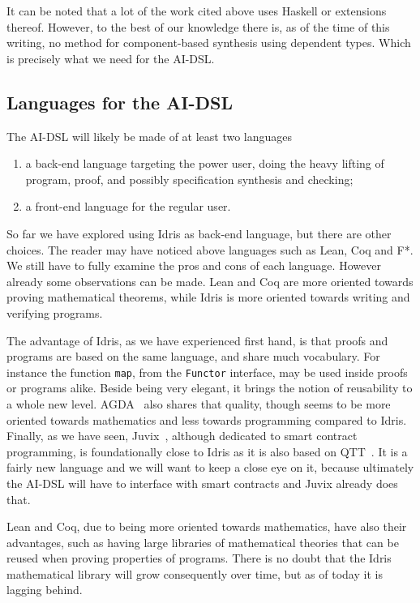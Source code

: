 \documentclass[]{report}
\begin{document}
It can be noted that a lot of the work cited above uses Haskell or
extensions thereof.  However, to the best of our knowledge there is,
as of the time of this writing, no method for component-based
synthesis using dependent types.  Which is precisely what we need for
the AI-DSL.

\subsection{Languages for the AI-DSL}
\label{subsec:languages_aidsl}

The AI-DSL will likely be made of at least two languages
\begin{enumerate}
\item a back-end language targeting the power user, doing the heavy
  lifting of program, proof, and possibly specification synthesis and
  checking;
\item a front-end language for the regular user.
\end{enumerate}
So far we have explored using Idris as back-end language, but there
are other choices.  The reader may have noticed above languages such
as Lean, Coq and F*.  We still have to fully examine the pros and cons
of each language.  However already some observations can be made.
Lean and Coq are more oriented towards proving mathematical theorems,
while Idris is more oriented towards writing and verifying programs.

The advantage of Idris, as we have experienced first hand, is that
proofs and programs are based on the same language, and share much
vocabulary.  For instance the function \texttt{map}, from the
\texttt{Functor} interface, may be used inside proofs or programs
alike.  Beside being very elegant, it brings the notion of reusability
to a whole new level.  AGDA~\cite{Norell2009} also shares that
quality, though seems to be more oriented towards mathematics and less
towards programming compared to Idris.  Finally, as we have seen,
Juvix~\cite{Goes2020}, although dedicated to smart contract
programming, is foundationally close to Idris as it is also based on
QTT~\cite{Atkey2018}.  It is a fairly new language and we will want to
keep a close eye on it, because ultimately the AI-DSL will have to
interface with smart contracts and Juvix already does that.

Lean and Coq, due to being more oriented towards mathematics, have
also their advantages, such as having large libraries of mathematical
theories that can be reused when proving properties of programs.
There is no doubt that the Idris mathematical library will grow
consequently over time, but as of today it is lagging behind.
\end{document}
